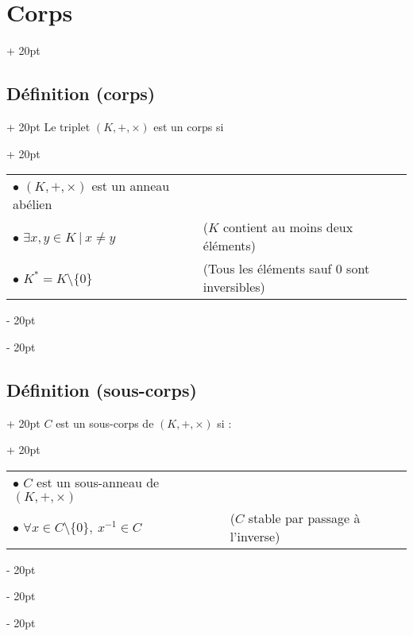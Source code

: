\documentclass[a4paper, 12pt, twoside]{article}
\newcommand{\ind}[1][20pt]{\advance\leftskip + #1}
\newcommand{\deind}[1][20pt]{\advance\leftskip - #1}
\newenvironment{indentedenv}[1][20pt]{\par \ind[#1]}{\par \deind}
\newenvironment{indt}[2][20pt]{#2 \begin{indentedenv}[#1]}{\end{indentedenv}} %
\begin{document}
    \vspace{12pt}
    
    \begin{indt}{\section{Corps}}
        
        \begin{indt}{\subsection{Définition (corps)}}
            \begin{indt}{Le triplet $(K, +, \times)$ est un corps si}
                \begin{tabular}{ll}
                    $\bullet$ $(K, +, \times)$ est un anneau abélien
                    \vspace{6pt}
                    \\
                    $\bullet$ $\exists x, y \in K\ |\ x \neq y$
                    & ($K$ contient au moins deux éléments)
                    \vspace{6pt}
                    \\
                    $\bullet$ $K^* = K \setminus \{0\}$
                    & (Tous les éléments sauf $0$ sont inversibles)
                \end{tabular}
            \end{indt}
        \end{indt}
        
        \vspace{6pt}
        
        \begin{indt}{\subsection{Définition (sous-corps)}}
            \begin{indt}{$C$ est un sous-corps de $(K, +, \times)$ si :}
                \begin{tabular}{ll}
                    $\bullet$ $C$ est un sous-anneau de $(K, +, \times)$
                    \vspace{6pt}
                    \\
                    $\bullet$ $\forall x \in C \setminus \{0\},\ x^{-1} \in C$
                    & ($C$ stable par passage à l'inverse)
                \end{tabular}
            \end{indt}
        \end{indt}
        
    \end{indt}
    
\end{document}

